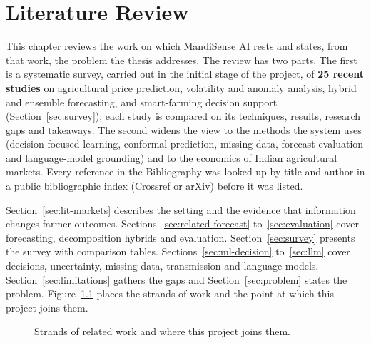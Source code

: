 \chapter{Literature Review}
\label{ch:lit}

This chapter reviews the work on which MandiSense AI rests and states, from that work, the problem the thesis addresses. The review has two parts. The first is a systematic survey, carried out in the initial stage of the project, of \textbf{25 recent studies} on agricultural price prediction, volatility and anomaly analysis, hybrid and ensemble forecasting, and smart-farming decision support (Section~\ref{sec:survey}); each study is compared on its techniques, results, research gaps and takeaways. The second widens the view to the methods the system uses (decision-focused learning, conformal prediction, missing data, forecast evaluation and language-model grounding) and to the economics of Indian agricultural markets. Every reference in the Bibliography was looked up by title and author in a public bibliographic index (Crossref or arXiv) before it was listed.

Section~\ref{sec:lit-markets} describes the setting and the evidence that information changes farmer outcomes. Sections~\ref{sec:related-forecast} to~\ref{sec:evaluation} cover forecasting, decomposition hybrids and evaluation. Section~\ref{sec:survey} presents the survey with comparison tables. Sections~\ref{sec:ml-decision} to~\ref{sec:llm} cover decisions, uncertainty, missing data, transmission and language models. Section~\ref{sec:limitations} gathers the gaps and Section~\ref{sec:problem} states the problem. Figure~\ref{fig:taxonomy} places the strands of work and the point at which this project joins them.

\begin{figure}[!b]
\centering
{}
\caption{Strands of related work and where this project joins them.}
\label{fig:taxonomy}
\end{figure}

